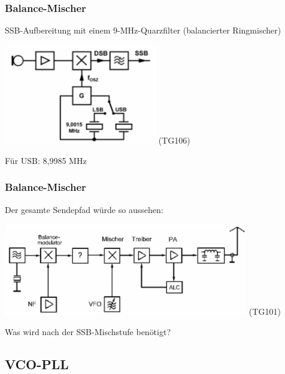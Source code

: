 \begin{frame}
    \frametitle{Balance-Mischer}

    SSB-Aufbereitung mit einem 9-MHz-Quarzfilter (balancierter Ringmischer)

    \begin{center}
        \includegraphics[width=0.5\textwidth]{a13/TG106.png}
        \tiny (TG106)
    \end{center}

    Für USB: 8,9985 MHz

\end{frame}

\begin{frame}
    \frametitle{Balance-Mischer}

    Der gesamte Sendepfad würde so aussehen:

    \begin{center}
        \includegraphics[width=0.8\textwidth]{a13/TG101.png}
        \tiny (TG101)
    \end{center}

    Was wird nach der SSB-Mischstufe benötigt?
    

\end{frame}

\subsection{VCO-PLL}

